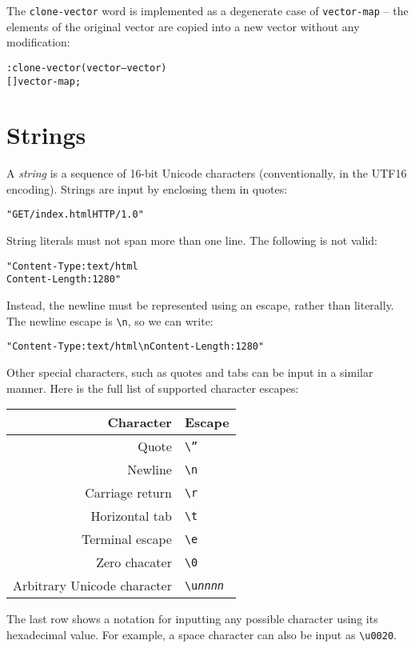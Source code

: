 \documentclass[english]{article}
\providecommand{\tabularnewline}{\\}
\begin{document}
The \texttt{clone-vector} word is implemented as a degenerate case of \texttt{vector-map} -- the elements of the original vector are copied into a new vector without any modification:

\begin{alltt}
: clone-vector ( vector -- vector )
    {[} {]} vector-map ;
\end{alltt}

\section{Strings}

A \emph{string} is a sequence of 16-bit Unicode characters (conventionally,
in the UTF16 encoding). Strings are input by enclosing them in quotes:

\begin{alltt}
"GET /index.html HTTP/1.0"
\end{alltt}
String literals must not span more than one line. The following is
not valid:

\begin{alltt}
"Content-Type: text/html
Content-Length: 1280"
\end{alltt}
Instead, the newline must be represented using an escape, rather than
literally. The newline escape is \texttt{\textbackslash{}n}, so we
can write:

\begin{alltt}
"Content-Type: text/html\textbackslash{}nContent-Length: 1280"
\end{alltt}
Other special characters, such as quotes and tabs can be input in
a similar manner. Here is the full list of supported character escapes:

\begin{tabular}{|r|l|}
\hline 
Character&
Escape\tabularnewline
\hline
\hline 
Quote&
\texttt{\textbackslash{}''}\tabularnewline
\hline 
Newline&
\texttt{\textbackslash{}n}\tabularnewline
\hline 
Carriage return&
\texttt{\textbackslash{}r}\tabularnewline
\hline 
Horizontal tab&
\texttt{\textbackslash{}t}\tabularnewline
\hline 
Terminal escape&
\texttt{\textbackslash{}e}\tabularnewline
\hline 
Zero chacater&
\texttt{\textbackslash{}0}\tabularnewline
\hline 
Arbitrary Unicode character&
\texttt{\textbackslash{}u}\texttt{\emph{nnnn}}\tabularnewline
\hline
\end{tabular}

The last row shows a notation for inputting any possible character
using its hexadecimal value. For example, a space character can also
be input as \texttt{\textbackslash{}u0020}.
\end{document}
